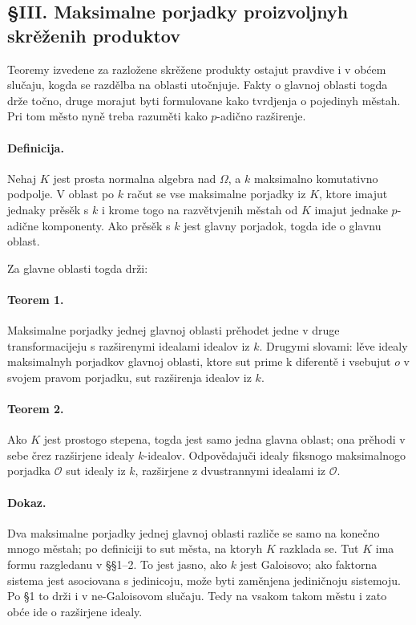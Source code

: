 \documentclass[11pt]{article}
\begin{document}
\subsection*{§III. Maksimalne porjadky proizvoljnyh skrěženih produktov}

Teoremy izvedene za razložene skrěžene produkty ostajut pravdive i v obćem slučaju, kogda se razdělba na oblasti utočnjuje. Fakty o glavnoj oblasti togda drže točno, druge morajut byti formulovane kako tvrdjenja o pojedinyh městah. Pri tom město nyně treba razuměti kako \(p\)-adično razširenje.

\paragraph{Definicija.}
Nehaj \(K\) jest prosta normalna algebra nad \(\Omega\), a \(k\) maksimalno komutativno podpolje. V oblast po \(k\) račut se vse maksimalne porjadky iz \(K\), ktore imajut jednaky prěsěk s \(k\) i krome togo na razvětvjenih městah od \(K\) imajut jednake \(p\)-adične komponenty. Ako prěsěk s \(k\) jest glavny porjadok, togda ide o glavnu oblast.

Za glavne oblasti togda drži:

\paragraph{Teorem 1.}
Maksimalne porjadky jednej glavnoj oblasti prěhodet jedne v druge transformacijeju s razširenymi idealami idealov iz \(k\). Drugymi slovami: lěve idealy maksimalnyh porjadkov glavnoj oblasti, ktore sut prime k diferentě i vsebujut \(o\) v svojem pravom porjadku, sut razširenja idealov iz \(k\).

\paragraph{Teorem 2.}
Ako \(K\) jest prostogo stepena, togda jest samo jedna glavna oblast; ona prěhodi v sebe črez razširjene idealy \(k\)-idealov. Odpovědajuči idealy fiksnogo maksimalnogo porjadka \(\mathcal O\) sut idealy iz \(k\), razširjene z dvustrannymi idealami iz \(\mathcal O\).

\paragraph{Dokaz.}
Dva maksimalne porjadky jednej glavnoj oblasti različe se samo na konečno mnogo městah; po definiciji to sut města, na ktoryh \(K\) razklada se. Tut \(K\) ima formu razgledanu v §§1--2. To jest jasno, ako \(k\) jest Galoisovo; ako faktorna sistema jest asociovana s jedinicoju, može byti zaměnjena jediničnoju sistemoju. Po §1 to drži i v ne-Galoisovom slučaju. Tedy na vsakom takom městu i zato obće ide o razširjene idealy.
\end{document}
